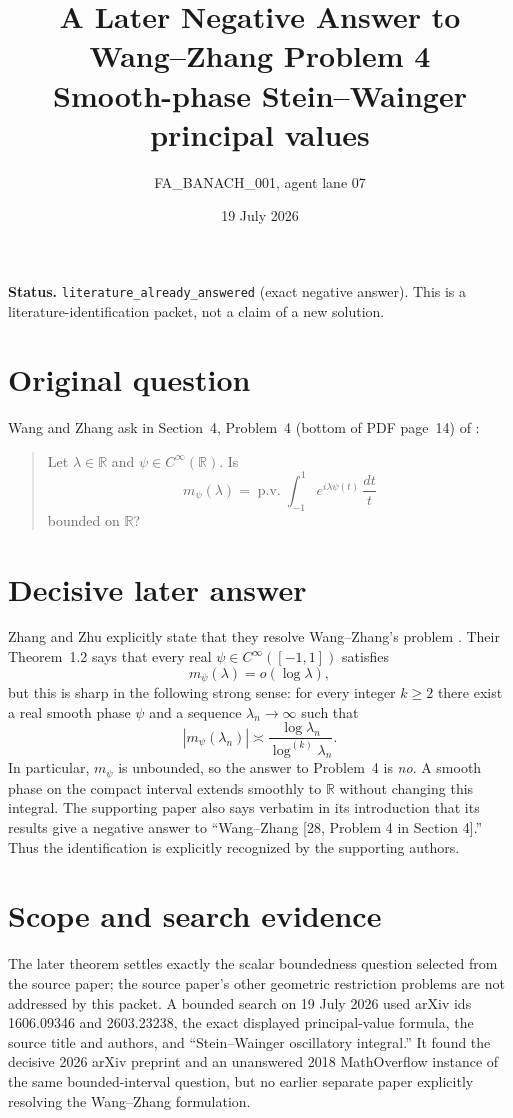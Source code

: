 \documentclass[11pt]{article}
\title{A Later Negative Answer to Wang--Zhang Problem 4\\
\large Smooth-phase Stein--Wainger principal values}
\author{FA\_BANACH\_001, agent lane 07}
\date{19 July 2026}
\newcommand{\pv}{\operatorname{p.v.}}
\begin{document}
\maketitle

\noindent\textbf{Status.}
\texttt{literature\_already\_answered} (exact negative answer).  This is a
literature-identification packet, not a claim of a new solution.

\section*{Original question}
Wang and Zhang ask in Section~4, Problem~4 (bottom of PDF page~14) of
\cite{WangZhang}:
\begin{quote}
Let $\lambda\in\mathbb R$ and $\psi\in C^\infty(\mathbb R)$.  Is
\[
 m_\psi(\lambda)=\pv\int_{-1}^{1}e^{i\lambda\psi(t)}\,\frac{dt}{t}
\]
bounded on $\mathbb R$?
\end{quote}

\section*{Decisive later answer}
Zhang and Zhu explicitly state that they resolve Wang--Zhang's problem
\cite[abstract and \S1.2]{ZhangZhu}.  Their Theorem~1.2 says that every real
$\psi\in C^\infty([-1,1])$ satisfies
\[
 m_\psi(\lambda)=o(\log\lambda),
\]
but this is sharp in the following strong sense: for every integer $k\ge2$
there exist a real smooth phase $\psi$ and a sequence $\lambda_n\to\infty$
such that
\[
 |m_\psi(\lambda_n)|\asymp
 \frac{\log\lambda_n}{\log^{(k)}\!\lambda_n}.
\]
In particular, $m_\psi$ is unbounded, so the answer to Problem~4 is
\emph{no}.  A smooth phase on the compact interval extends smoothly to
$\mathbb R$ without changing this integral.  The supporting paper also says
verbatim in its introduction that its results give a negative answer to
``Wang--Zhang [28, Problem 4 in Section 4].''  Thus the identification is
explicitly recognized by the supporting authors.

\section*{Scope and search evidence}
The later theorem settles exactly the scalar boundedness question selected
from the source paper; the source paper's other geometric restriction
problems are not addressed by this packet.  A bounded search on 19 July 2026
used arXiv ids 1606.09346 and 2603.23238, the exact displayed principal-value
formula, the source title and authors, and ``Stein--Wainger oscillatory
integral.''  It found the decisive 2026 arXiv preprint and an unanswered 2018
MathOverflow instance of the same bounded-interval question, but no earlier
separate paper explicitly resolving the Wang--Zhang formulation.
\end{document}

